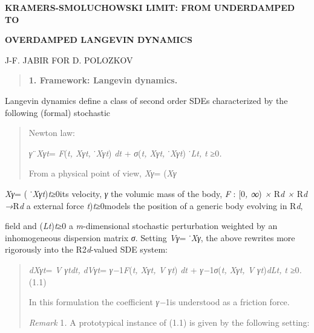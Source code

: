 \documentclass[
]{article}
\author{}
\date{}
\begin{document}
\textbf{KRAMERS-SMOLUCHOWSKI LIMIT: FROM UNDERDAMPED TO}

\textbf{OVERDAMPED LANGEVIN DYNAMICS}

J-F. JABIR FOR D. POLOZKOV

\begin{quote}
\textbf{1. Framework: Langevin dynamics.}
\end{quote}

Langevin dynamics define a class of second order SDEs characterized by
the following (formal) stochastic

\begin{quote}
Newton law:

\emph{γ}¨\emph{Xγt}= \emph{F}(\emph{t, Xγt,} ˙\emph{Xγt}) \emph{dt} +
\emph{σ}(\emph{t, Xγt,} ˙\emph{Xγt}) ˙\emph{Lt,} \emph{t ≥}0\emph{.}

From a physical point of view, \emph{Xγ}= (\emph{Xγ}
\end{quote}

\emph{Xγ}= ( ˙\emph{Xγt})\emph{t≥}0its velocity, \emph{γ} the volumic
mass of the body, \emph{F} : {[}0\emph{, ∞}) \emph{×} R\emph{d ×}
R\emph{d →}R\emph{d} a external force \emph{t})\emph{t≥}0models the
position of a generic body evolving in R\emph{d},

field and (\emph{Lt})\emph{t≥}0 a \emph{m}-dimensional stochastic
perturbation weighted by an inhomogeneous dispersion matrix \emph{σ}.
Setting \emph{Vγ}= ˙\emph{Xγ}, the above rewrites more rigorously into
the R2\emph{d}-valued SDE system:

\begin{quote}
\emph{dXγt}= \emph{V γtdt,} \emph{dVγt}= \emph{γ−}1\emph{F}(\emph{t,
Xγt, V γt}) \emph{dt} + \emph{γ−}1\emph{σ}(\emph{t, Xγt, V
γt})\emph{dLt,} \emph{t ≥}0\emph{.} (1.1)

In this formulation the coefficient \emph{γ−}1is understood as a
friction force.

\emph{Remark} 1\emph{.} A prototypical instance of (1.1) is given by the
following setting:
\end{quote}
\end{document}
